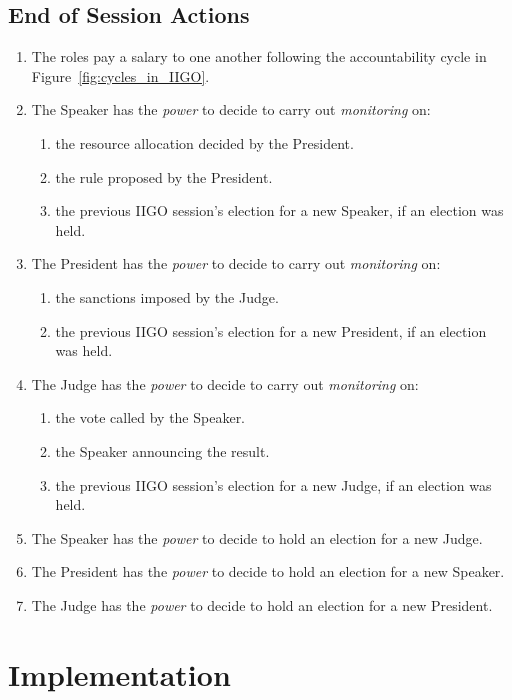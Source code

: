 \subsection{End of Session Actions}
\begin{enumerate}
    \item The roles pay a salary to one another following the accountability cycle in Figure~\ref{fig:cycles_in_IIGO}.

    \item The Speaker has the \emph{power} to decide to carry out \emph{monitoring} on:
    \begin{enumerate}
    \item the resource allocation decided by the President.
    \item the rule proposed by the President.
    \item the previous IIGO session's election for a new Speaker, if an election was held.
    \end{enumerate}
    \item The President has the \emph{power} to decide to carry out \emph{monitoring} on:
    \begin{enumerate}
        \item the sanctions imposed by the Judge.
        \item the previous IIGO session's election for a new President, if an election was held.
    \end{enumerate}
    \item The Judge has the \emph{power} to decide to carry out \emph{monitoring} on:
    \begin{enumerate}
        \item the vote called by the Speaker.
        \item the Speaker announcing the result.
        \item the previous IIGO session's election for a new Judge, if an election was held.
    \end{enumerate}
    \item The Speaker has the \emph{power} to decide to hold an election for a new Judge.
    \item The President has the \emph{power} to decide to hold an election for a new Speaker.
    \item The Judge has the \emph{power} to decide to hold an election for a new President.
\end{enumerate}

\section{Implementation} %

